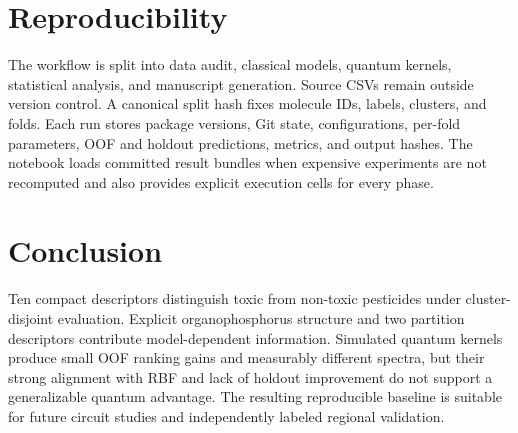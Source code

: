 \documentclass[conference]{IEEEtran}
\begin{document}
\section{Reproducibility}

The workflow is split into data audit, classical models, quantum kernels,
statistical analysis, and manuscript generation. Source CSVs remain outside
version control. A canonical split hash fixes molecule IDs, labels, clusters,
and folds. Each run stores package versions, Git state, configurations,
per-fold parameters, OOF and holdout predictions, metrics, and output hashes.
The notebook loads committed result bundles when expensive experiments are not
recomputed and also provides explicit execution cells for every phase.

\section{Conclusion}

Ten compact descriptors distinguish toxic from non-toxic pesticides under
cluster-disjoint evaluation. Explicit organophosphorus structure and two
partition descriptors contribute model-dependent information. Simulated
quantum kernels produce small OOF ranking gains and measurably different
spectra, but their strong alignment with RBF and lack of holdout improvement
do not support a generalizable quantum advantage. The resulting reproducible
baseline is suitable for future circuit studies and independently labeled
regional validation.



\end{document}
